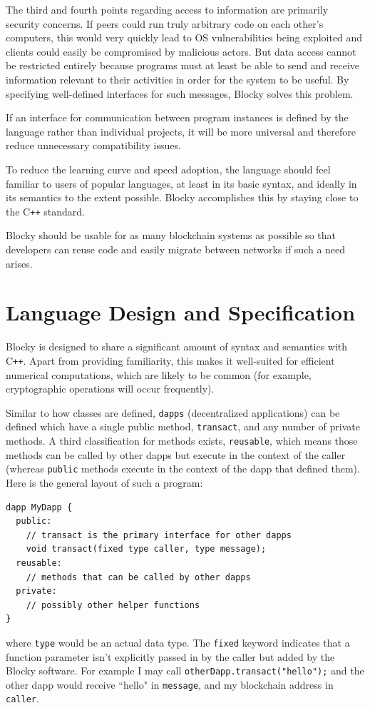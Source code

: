 \documentclass[letterpaper]{article}
\begin{document}
The third and fourth points regarding access to information are primarily security concerns. If peers could run truly arbitrary code on each other's computers, this would very quickly lead to OS vulnerabilities being exploited and clients could easily be compromised by malicious actors. But data access cannot be restricted entirely because programs must at least be able to send and receive information relevant to their activities in order for the system to be useful. By specifying well-defined interfaces for such messages, Blocky solves this problem.

If an interface for communication between program instances is defined by the language rather than individual projects, it will be more universal and therefore reduce unnecessary compatibility issues.

To reduce the learning curve and speed adoption, the language should feel familiar to users of popular languages, at least in its basic syntax, and ideally in its semantics to the extent possible. Blocky accomplishes this by staying close to the C\texttt{++} standard.

Blocky should be usable for as many blockchain systems as possible so that developers can reuse code and easily migrate between networks if such a need arises.

\section{Language Design and Specification}

Blocky is designed to share a significant amount of syntax and semantics with C\texttt{++}. Apart from providing familiarity, this makes it well-suited for efficient numerical computations, which are likely to be common (for example, cryptographic operations will occur frequently).

Similar to how classes are defined, \texttt{dapps} (decentralized applications) can be defined which have a single public method, \texttt{transact}, and any number of private methods. A third classification for methods exists, \texttt{reusable}, which means those methods can be called by other dapps but execute in the context of the caller (whereas \texttt{public} methods execute in the context of the dapp that defined them). Here is the general layout of such a program:
\begin{lstlisting}
dapp MyDapp {
  public:
    // transact is the primary interface for other dapps
    void transact(fixed type caller, type message);
  reusable:
    // methods that can be called by other dapps
  private:
    // possibly other helper functions
}
\end{lstlisting}
where \texttt{type} would be an actual data type. The \texttt{fixed} keyword indicates that a function parameter isn't explicitly passed in by the caller but added by the Blocky software. For example I may call \texttt{otherDapp.transact("hello");} and the other dapp would receive ``hello" in \texttt{message}, and my blockchain address in \texttt{caller}.
\end{document}
